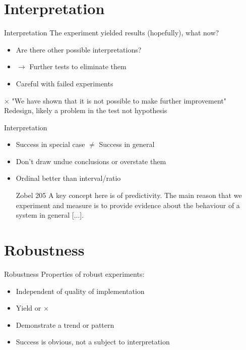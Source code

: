 \documentclass{beamer}
\begin{document}
\section{Interpretation}
\begin{frame}{Interpretation}
The experiment yielded results (hopefully), what now? \\
\begin{itemize}
\item Are there other possible interpretations?
\item[] $\rightarrow$ Further tests to eliminate them
\item Careful with failed experiments

\end{itemize}
\color{red} $\times$ \color{black} "We have shown that it is not possible to
make further improvement" \\
\color{green} \checkmark \color{black} Redesign, likely a problem in the test not hypothesis
\end{frame}

\begin{frame}{Interpretation}
\begin{itemize}
\item  Success in special case $\not =$ Success in general
\item Don't draw undue conclusions or overstate them
\item Ordinal better than interval/ratio
\begin{block}{Zobel 205}
A key concept here is of predictivity. The main reason that we experiment and
measure is to provide evidence about the behaviour of a system in general [...].
\end{block}
\end{itemize}
\end{frame}


\section{Robustness}
\begin{frame}{Robustness}
Properties of robust experiments:
\begin{itemize}

\item Independent of quality of implementation 
\item Yield \color{green}\checkmark \color{black}  or \color{red} $\times$ \color{black} 
\item Demonstrate a trend or pattern
\item Success is obvious, not a subject to interpretation

\end{itemize}
\end{frame}
\end{document}
